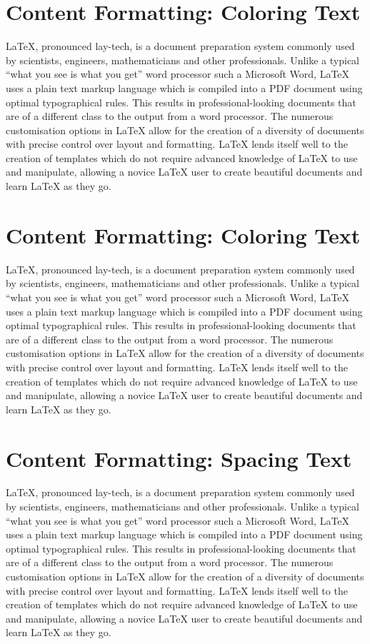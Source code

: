 \documentclass{article}
\begin{document}
	\section*{Content Formatting: Coloring Text}
	LaTeX, pronounced lay-tech, is a document preparation system commonly used 
	by scientists, engineers, mathematicians and other professionals. Unlike a 
	typical “what you see is what you get” word processor such a Microsoft 
	Word, LaTeX uses a plain text markup language which is compiled into a PDF 
	document using optimal typographical rules. This results in 
	professional-looking documents that are of a different class to the output 
	from a word processor. The numerous customisation options in LaTeX allow 
	for the creation of a diversity of documents with precise control over 
	layout and formatting. LaTeX lends itself well to the creation of templates 
	which do not require advanced knowledge of LaTeX to use and manipulate, 
	allowing a novice LaTeX user to create beautiful documents and learn LaTeX 
	as they go.
	
	
	\section*{Content Formatting: Coloring Text}
	LaTeX, pronounced lay-tech, is a document preparation system commonly used 
	by scientists, engineers, mathematicians and other professionals. Unlike a 
	typical “what you see is what you get” word processor such a Microsoft 
	Word, LaTeX uses a plain text markup language which is compiled into a PDF 
	document using optimal typographical rules. This results in 
	professional-looking documents that are of a different class to the output 
	from a word processor. The numerous customisation options in LaTeX allow 
	for the creation of a diversity of documents with precise control over 
	layout and formatting. LaTeX lends itself well to the creation of templates 
	which do not require advanced knowledge of LaTeX to use and manipulate, 
	allowing a novice LaTeX user to create beautiful documents and learn LaTeX 
	as they go.
	
	\section*{Content Formatting: Spacing Text }
	LaTeX, pronounced lay-tech, is a document preparation system commonly used 
	by scientists, engineers, mathematicians and other professionals. Unlike a 
	typical “what you see is what you get” word processor such a Microsoft 
	Word, LaTeX uses a plain text markup language which is compiled into a PDF 
	document using optimal typographical rules. This results in 
	professional-looking documents that are of a different class to the output 
	from a word processor. The numerous customisation options in LaTeX allow 
	for the creation of a diversity of documents with precise control over 
	layout and formatting. LaTeX lends itself well to the creation of templates 
	which do not require advanced knowledge of LaTeX to use and manipulate, 
	allowing a novice LaTeX user to create beautiful documents and learn LaTeX 
	as they go.
	
\end{document}
